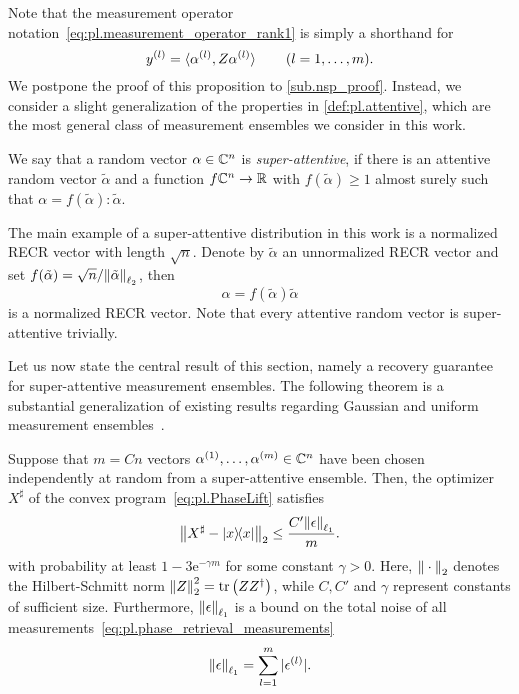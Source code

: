 Note that the measurement operator notation~\eqref{eq:pl.measurement_operator_rank1} is simply a shorthand for
\[
  y^{(l)} = \braket{\alpha^{(l)}, Z\alpha^{(l)}} \quad\quad (l=1,\ldots,m).
\]
We postpone the proof of this proposition to \cref{sub.nsp_proof}.
Instead, we consider a slight generalization of the properties in \cref{def:pl.attentive}, which are the most general class of measurement ensembles we consider in this work.
\begin{definition}%
  \label{def:pl.super_attentitive}
  We say that a random vector $\alpha \in {\mathbb{C}}^n$ is \emph{super-attentive}, if there is an attentive random vector $\tilde\alpha$ and a function $f {\mathbb{C}}^n \to {\mathbb{R}}$ with $f(\tilde\alpha) \ge 1$ almost surely such that $\alpha = f(\tilde\alpha)\colon \tilde\alpha$.
\end{definition}
The main example of a super-attentive distribution in this work is a normalized RECR vector with length $\sqrt{n}$.
Denote by $\tilde\alpha$ an unnormalized RECR vector and set $f(\tilde\alpha) = \sqrt{n} / {\Vert\tilde\alpha\Vert}_{\ell_2}$, then
\[
  \alpha = f(\tilde\alpha) \tilde\alpha
  \label{eq:pl.normalized_recr}
\]
is a normalized RECR vector.
Note that every attentive random vector is super-attentive trivially.

Let us now state the central result of this section, namely a recovery guarantee for super-attentive measurement ensembles.
The following theorem is a substantial generalization of existing results regarding Gaussian and uniform measurement ensembles~\cite{Candes_2012_Solving,Demanet_2014_Stable}.

\begin{theorem}%
  \label{thm:pl.phaselift_noisy}
  Suppose that $m = Cn$ vectors $\alpha^{(1)},\ldots,\alpha^{(m)} \in \mathbb{C}^n$ have been chosen independently at random from a super-attentive ensemble.
  Then, the optimizer $X^\sharp$ of the convex program~\eqref{eq:pl.PhaseLift} satisfies
  \[
    \Fnorm{{X}^\sharp - \ketbra{x}} \leq \frac{C'  \norm{\epsilon}_{\ell_1}}{m}.
    \label{eq:pl.noisy_recovery_bound}
  \]
  with probability at least $1 - 3\mathrm{e}^{-\gamma m}$ for some constant $\gamma > 0$.
  Here, ${\Vert\cdot\Vert}_{2}$ denotes the Hilbert-Schmitt norm ${\Vert Z\Vert}_{2}^2 = \operatorname{tr} \left( {Z} {Z}^\dagger \right)$, while $C,C'$ and $\gamma$ represent constants of sufficient size.
  Furthermore, ${\Vert\epsilon\Vert}_{\ell_1}$ is a bound on the total noise of all measurements~\eqref{eq:pl.phase_retrieval_measurements}
  \[
    {\Vert\epsilon\Vert}_{\ell_1} = \sum_{l=1}^m {\vert\epsilon^{(l)}\vert}.
    \label{eq:pl.phaselift_noisy.noise_bound}
  \]
\end{theorem}

